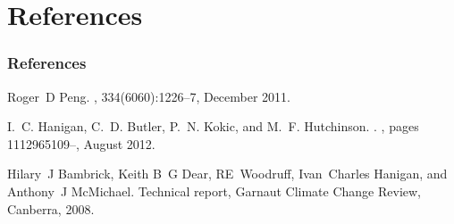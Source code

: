 \documentclass[bigger]{beamer}
\begin{document}
\section{References}
\label{sec-6}
\begin{frame}
\frametitle{References}
\label{sec-6-1}

\begin{footnotesize}
\begin{thebibliography}{1}

Roger~D Peng.
, 334(6060):1226--7, December 2011.

I.~C. Hanigan, C.~D. Butler, P.~N. Kokic, and M.~F. Hutchinson.
.
, pages
  1112965109--, August 2012.

Hilary~J Bambrick, Keith B~G Dear, RE~Woodruff, Ivan~Charles Hanigan, and
  Anthony~J McMichael.
\newblock Technical report, Garnaut Climate Change Review, Canberra, 2008.

\end{thebibliography}
\end{footnotesize}
\end{frame}
\end{document}
